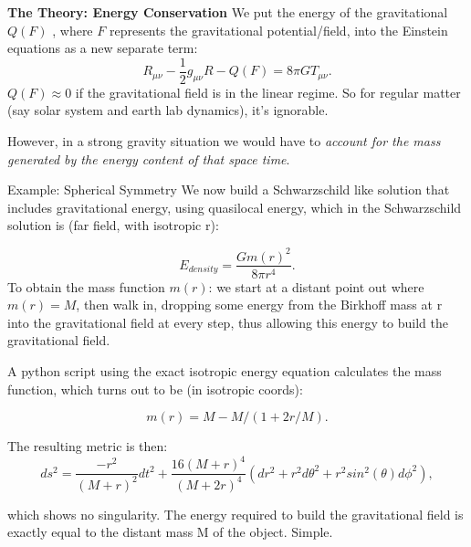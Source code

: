 \documentclass[final]{beamer}
\newlength{\colwidth}
\begin{document}
\begin{frame}[t]
\begin{columns}[t]
\begin{column}{\colwidth}
  \begin{block}{\textbf{The Theory: Energy Conservation}}
We put the energy of the gravitational $Q(F)$ , where $F$ represents the gravitational potential/field, into the Einstein equations as a new separate term: 
  \begin{equation}
R_{\mu\nu}-\dfrac{1}{2}g_{\mu\nu}R - Q(F) = 8\pi G T_{\mu \nu}.
\label{newEquation}
\end{equation}
	$Q(F) \approx 0$ if the gravitational field is in the linear regime. So for regular matter (say solar system and earth lab dynamics), it's ignorable. 
	
	However, in a strong gravity situation we would have to \textit{account for the mass generated by the energy content of that space time}.
\end{block}
  
  \begin{block}{Example: Spherical Symmetry }
 We now build a Schwarzschild like solution that includes gravitational energy, using quasilocal energy, which in the Schwarzschild solution is (far field, with isotropic r)\cite{lyndenbell1985}: 

\begin{equation} \label{energyDensityEqn}
	E_{density} = \frac{Gm(r)^2}{8 \pi r^4}.
\end{equation}
To obtain the mass function $m(r)$: we start at a distant point out where $m(r) = M$, then walk in, dropping some energy from the Birkhoff mass at r into the gravitational field at every step, thus allowing this energy to build the gravitational field.
	
A python script\cite{RzeroJupyterGravitationalEnergyipynb} using the exact isotropic energy equation calculates the mass function, which turns out to be (in isotropic coords):

\begin{equation}
	m(r) = M - M/(1 + 2r/M).
\end{equation}

The resulting metric is then:
		\begin{equation} \label{lineElement}
			ds^2 = \frac{-r^2}{(M+r)^2}dt^2 + \frac{16(M+r)^4}{(M+2r)^4}(dr^2 + r^2d\theta^2 + r^2 sin^2(\theta)d\phi^2),
		\end{equation}

which shows no singularity. The energy required to build the gravitational field is exactly equal to the distant mass M of the object. Simple.
\end{block}


\end{column}
\end{columns}
\end{frame}
\end{document}
